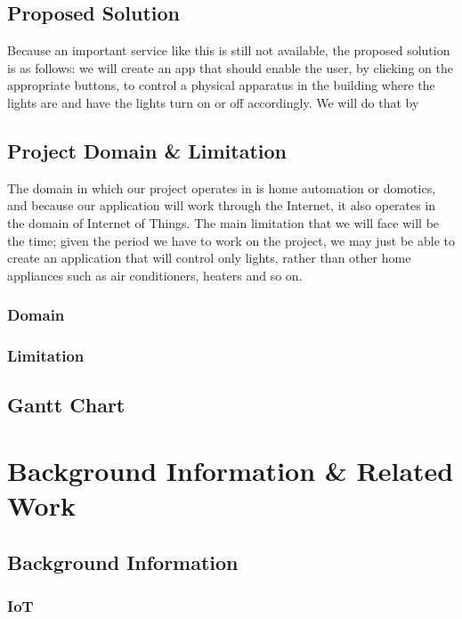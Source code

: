 \documentclass[a4paper, 12pt, oneside]{book}
\begin{document}
		\section{Proposed Solution}
		Because an important service like this is still not available, the proposed solution is as follows: we will create an app that should enable the user, by clicking on the appropriate buttons, to control a physical apparatus in the building where the lights are and have the lights turn on or off accordingly. We will do that by
		\section{Project Domain \& Limitation}
The domain in which our project operates in is home automation or domotics, and because our application will work through the Internet, it also operates in the domain of Internet of Things. 
The main limitation that we will face will be the time; given the period we have to work on the project, we may just be able to create an application that will control only lights, rather than other home appliances such as air conditioners, heaters and so on. 
			\subsection{Domain}
			\subsection{Limitation}
		\section{Gantt Chart}
		\newpage	
		\chapter{Background Information \& Related Work}
			\section{Background Information}
			\subsection{IoT}
\end{document}
